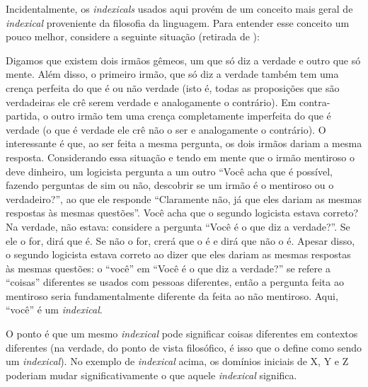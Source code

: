 \documentclass{article}
\begin{document}
Incidentalmente, os \textit{indexicals} usados aqui provém de um conceito mais geral de \textit{indexical} proveniente da filosofia da linguagem.
Para entender esse conceito um pouco melhor, considere a seguinte situação (retirada de \cite{raymond}):

Digamos que existem dois irmãos gêmeos, um que só diz a verdade e outro que só mente. Além disso, o primeiro irmão, que só diz a
verdade também tem uma crença perfeita do que é ou não verdade (isto é, todas as proposições que são verdadeiras ele crê serem
verdade e analogamente o contrário). Em contra-partida, o outro irmão tem uma crença completamente imperfeita do que é verdade
(o que é verdade ele crê não o ser e analogamente o contrário). O interessante é que, ao ser feita a mesma pergunta,
os dois irmãos dariam a mesma resposta. Considerando essa situação e tendo em mente que o irmão mentiroso o deve dinheiro,
um logicista pergunta a um outro ``Você acha que é possível, fazendo perguntas de sim ou não, descobrir se um irmão é o mentiroso ou o verdadeiro?'', ao que ele responde ``Claramente não, já que eles dariam as mesmas respostas às mesmas questões''.
Você acha que o segundo logicista estava correto?\\
Na verdade, não estava: considere a pergunta ``Você é o que diz a verdade?''. Se ele o for, dirá que é. Se não o for, crerá que
o é e dirá que não o é. Apesar disso, o segundo logicista estava correto ao dizer que eles dariam as mesmas respostas às mesmas questões: o ``você'' em ``Você é o que diz a verdade?'' se refere a ``coisas'' diferentes se usados com pessoas diferentes,
então a pergunta feita ao mentiroso seria fundamentalmente diferente da feita ao não mentiroso. Aqui, ``você'' é um \textit{indexical}.

O ponto é que um mesmo \textit{indexical} pode significar coisas diferentes em contextos diferentes (na verdade, do ponto de vista filosófico, é isso que o define como sendo um \textit{indexical}). No exemplo de \textit{indexical} acima, os domínios iniciais de X, Y e Z poderiam
mudar significativamente o que aquele \textit{indexical} significa.

\end{document}
